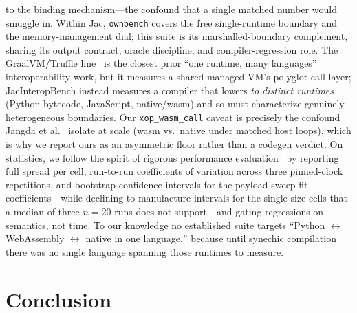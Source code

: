 \documentclass[conference]{IEEEtran}
\newcommand{\code}[1]{\texttt{#1}}
\begin{document}
to the binding mechanism---the confound that a single matched number would
smuggle in. Within Jac, \code{ownbench}
covers the free single-runtime boundary and the memory-management dial; this suite
is its marshalled-boundary complement, sharing its output contract, oracle
discipline, and compiler-regression role. The GraalVM/Truffle line~\cite{graal} is the closest prior ``one runtime, many
languages'' interoperability work, but it measures a shared managed VM's
polyglot call layer; JacInteropBench instead measures a compiler that lowers
\emph{to distinct runtimes} (Python bytecode, JavaScript, native/wasm) and so
must characterize genuinely heterogeneous boundaries. Our \code{xop\_wasm\_call}
caveat is precisely the confound Jangda et al.~\cite{jangda} isolate at scale
(wasm vs.\ native under matched host loops), which is why we report ours as an
asymmetric floor rather than a codegen verdict. On statistics, we follow the
spirit of rigorous performance evaluation~\cite{georges,renaissance} by
reporting full spread per cell, run-to-run coefficients of variation across three
pinned-clock repetitions, and bootstrap confidence intervals for the payload-sweep
fit coefficients---while declining to manufacture intervals for the single-size
cells that a median of three $n{=}20$ runs does not support---and gating
regressions on semantics, not time. To our knowledge no
established suite targets ``Python $\leftrightarrow$ WebAssembly
$\leftrightarrow$ native in one language,'' because until synechic compilation
there was no single language spanning those runtimes to measure.

\section{Conclusion}
\label{sec:conclusion}
\end{document}
